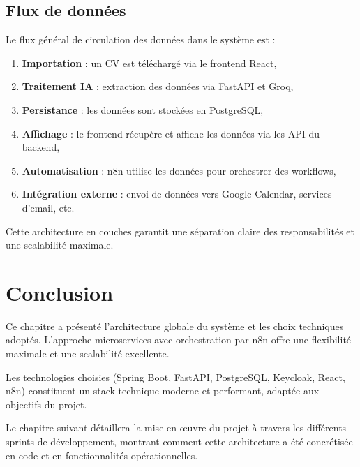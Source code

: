 \subsection{Flux de données}
\label{subsec:flux-donnees}

Le flux général de circulation des données dans le système est :

\begin{enumerate}
    \item \textbf{Importation} : un CV est téléchargé via le frontend React,
    
    \item \textbf{Traitement IA} : extraction des données via FastAPI et Groq,
    
    \item \textbf{Persistance} : les données sont stockées en PostgreSQL,
    
    \item \textbf{Affichage} : le frontend récupère et affiche les données via les API du backend,
    
    \item \textbf{Automatisation} : n8n utilise les données pour orchestrer des workflows,
    
    \item \textbf{Intégration externe} : envoi de données vers Google Calendar, services d'email, etc.
\end{enumerate}

Cette architecture en couches garantit une séparation claire des responsabilités et une scalabilité maximale.


\section{Conclusion}
\label{sec:conclusion-chap2}

Ce chapitre a présenté l'architecture globale du système et les choix techniques adoptés. L'approche microservices avec orchestration par n8n offre une flexibilité maximale et une scalabilité excellente.

Les technologies choisies (Spring Boot, FastAPI, PostgreSQL, Keycloak, React, n8n) constituent un stack technique moderne et performant, adaptée aux objectifs du projet.

Le chapitre suivant détaillera la mise en œuvre du projet à travers les différents sprints de développement, montrant comment cette architecture a été concrétisée en code et en fonctionnalités opérationnelles.

\newpage
